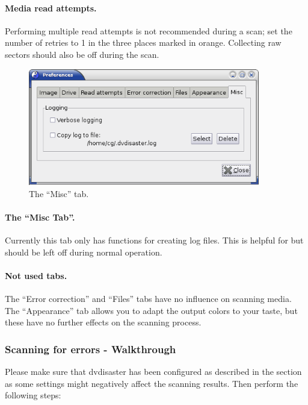 \paragraph{Media read attempts.} Performing multiple read attempts
is not recommended during a scan; set the number of retries to 1
in the three places marked in orange. Collecting raw sectors should
also be off during the scan.

\newpage

\begin{figure}[h]
\centerline{\includegraphics[width=0.9\textwidth]{screenshots/general-prefs-misc.png}}
\caption{The ``Misc'' tab.}  
\label{howto-scan-prefs-misc}
\end{figure}

\paragraph{The ``Misc Tab''.} Currently
this tab only has functions for creating log files.
This is helpful for  but
should be left off during normal operation.

\paragraph{Not used tabs.} The ``Error correction'' and ``Files'' tabs
have no influence on scanning media. The ``Appearance'' tab
allows you to adapt the output colors to your taste, but these have
no further effects on the scanning process. 

\newpage
\subsubsection{Scanning for errors - Walkthrough}
\label{howto-scan-walkthrough}

Please make sure that dvdisaster has been configured as
described in the  section
as some settings might negatively affect the scanning results.
Then perform the following steps: 

